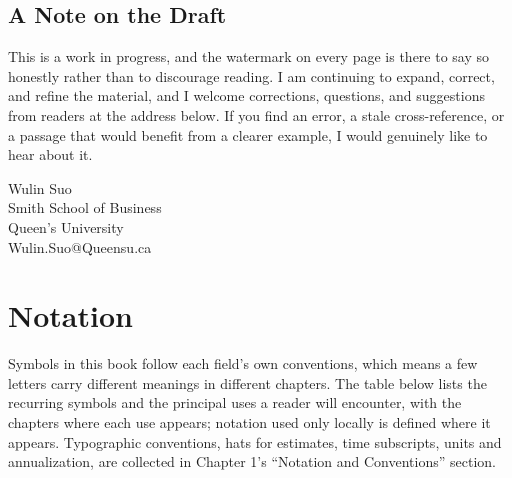 \documentclass{book}
\begin{document}
\section*{A Note on the Draft}

This is a work in progress, and the watermark on every page is there to say so honestly rather than to discourage reading. 
I am continuing to expand, correct, and refine the material, and I welcome corrections, questions, and suggestions from 
readers at the address below. If you find an error, a stale cross-reference, or a passage that would benefit from a clearer example, 
I would genuinely like to hear about it.

\vspace{1em}
\noindent Wulin Suo\\
Smith School of Business \\
Queen's University\\
Wulin.Suo@Queensu.ca

\clearpage
{}
\chapter*{Notation}

Symbols in this book follow each field's own conventions, which means a few letters carry different meanings in different chapters. The table below lists the recurring symbols and the principal uses a reader will encounter, with the chapters where each use appears; notation used only locally is defined where it appears. Typographic conventions, hats for estimates, time subscripts, units and annualization, are collected in Chapter 1's ``Notation and Conventions'' section.
\end{document}
